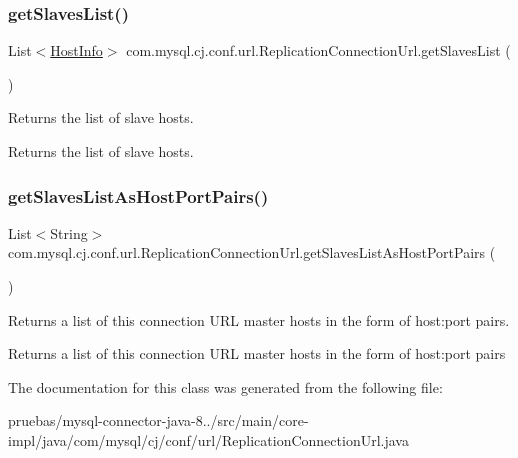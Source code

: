 \subsubsection{\texorpdfstring{get\+Slaves\+List()}{getSlavesList()}}
{\footnotesize\ttfamily List$<$\mbox{\hyperlink{classcom_1_1mysql_1_1cj_1_1conf_1_1_host_info}{Host\+Info}}$>$ com.\+mysql.\+cj.\+conf.\+url.\+Replication\+Connection\+Url.\+get\+Slaves\+List (\begin{DoxyParamCaption}{ }\end{DoxyParamCaption})}

Returns the list of slave hosts.

\begin{DoxyReturn}{Returns}
the list of slave hosts. 
\end{DoxyReturn}
\mbox{\label{classcom_1_1mysql_1_1cj_1_1conf_1_1url_1_1_replication_connection_url_aaf09eba8b7c2e3d417b6a9d4df7264a4}} 
\subsubsection{\texorpdfstring{get\+Slaves\+List\+As\+Host\+Port\+Pairs()}{getSlavesListAsHostPortPairs()}}
{\footnotesize\ttfamily List$<$String$>$ com.\+mysql.\+cj.\+conf.\+url.\+Replication\+Connection\+Url.\+get\+Slaves\+List\+As\+Host\+Port\+Pairs (\begin{DoxyParamCaption}{ }\end{DoxyParamCaption})}

Returns a list of this connection U\+RL master hosts in the form of host\+:port pairs.

\begin{DoxyReturn}{Returns}
a list of this connection U\+RL master hosts in the form of host\+:port pairs 
\end{DoxyReturn}


The documentation for this class was generated from the following file\+:\begin{DoxyCompactItemize}
\item 
pruebas/mysql-\/connector-\/java-\/8../src/main/core-\/impl/java/com/mysql/cj/conf/url/Replication\+Connection\+Url.\+java\end{DoxyCompactItemize}
